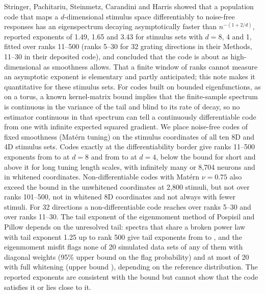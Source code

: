 Stringer, Pachitariu, Steinmetz, Carandini and Harris showed that a population code that maps a $d$-dimensional stimulus space differentiably to noise-free responses has an eigenspectrum decaying asymptotically faster than $n^{-(1+2/d)}$, reported exponents of 1.49, 1.65 and 3.43 for stimulus sets with $d = 8$, 4 and 1, fitted over ranks 11--500 (ranks 5--30 for 32 grating directions in their Methods, 11--30 in their deposited code), and concluded that the code is about as high-dimensional as smoothness allows. That a finite window of ranks cannot measure an asymptotic exponent is elementary and partly anticipated; this note makes it quantitative for these stimulus sets. For codes built on bounded eigenfunctions, as on a torus, a known kernel-matrix bound implies that the finite-sample spectrum is continuous in the variance of the tail and blind to its rate of decay, so no estimator continuous in that spectrum can tell a continuously differentiable code from one with infinite expected squared gradient. We place noise-free codes of fixed smoothness (Mat\'ern tuning) on the stimulus coordinates of all ten 8D and 4D stimulus sets. Codes exactly at the differentiability border give ranks 11--500 exponents from \WinBorderEightMin{} to \WinBorderEightMax{} at $d = 8$ and from \WinBorderFourMin{} to \WinBorderFourMax{} at $d = 4$, below the bound for short and above it for long tuning length scales, with infinitely many or 8,704 neurons and in whitened coordinates. Non-differentiable codes with Mat\'ern $\nu = 0.75$ also exceed the bound in the unwhitened coordinates at 2,800 stimuli, but not over ranks 101--500, not in whitened 8D coordinates and not always with fewer stimuli. For 32 directions a non-differentiable code reaches \PropWSmoothA{} over ranks 5--30 and \PropWSmoothAEleven{} over ranks 11--30. The tail exponent of the eigenmoment method of Pospisil and Pillow depends on the unresolved tail: spectra that share a broken power law with tail exponent 1.25 up to rank 500 give tail exponents from \MemeTailMinA{} to \MemeTailMaxA{}, and the eigenmoment misfit flags none of 20 simulated data sets of any of them with diagonal weights (95\% upper bound \MemeFlagZeroHi{} on the flag probability) and at most \MemeFlagMaxN{} of 20 with full whitening (upper bound \MemeFlagMaxHi{}), depending on the reference distribution. The reported exponents are consistent with the bound but cannot show that the code satisfies it or lies close to it.

